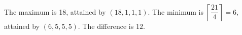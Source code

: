 The maximum is 18, attained by $(18,1,1,1)$. The minimum is $\left\lceil\dfrac{21}{4}\right\rceil=6$, attained by $(6,5,5,5)$. The difference is $\boxed{12}$.
